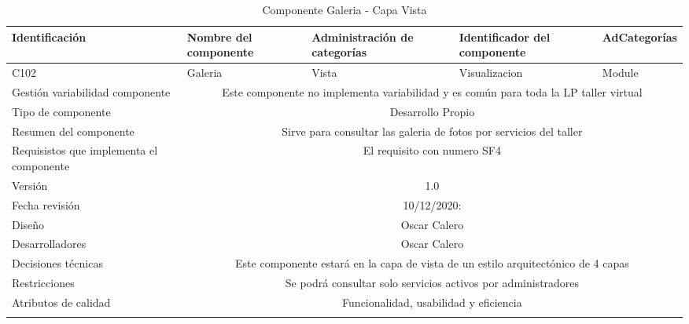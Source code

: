 \documentclass[10pt,a4paper,openany]{book}
\begin{document}
\begin{longtable}{|p{3cm}|p{3cm}|p{3cm}|p{3cm}|p{3cm}|} \hline
Identificación & Nombre del componente & Administración de categorías & Identificador del componente & AdCategorías \\[0.5ex] \hline
C102& Galeria& Vista& Visualizacion& Module\\[0.5ex] \hline
Gestión variabilidad componente & \multicolumn{4}{|c|}{Este componente no implementa variabilidad y es común para toda la LP taller virtual} \\ \hline
Tipo de componente & \multicolumn{4}{|c|}{Desarrollo Propio} \\ \hline
Resumen del componente & \multicolumn{4}{|c|}{Sirve para consultar las galeria de fotos por servicios del taller} \\ \hline
Requisistos que implementa el componente & \multicolumn{4}{|c|}{El requisito con numero SF4 } \\ \hline
Versión & \multicolumn{4}{|c|}{1.0 } \\ \hline
Fecha revisión & \multicolumn{4}{|c|}{ 10/12/2020:} \\ \hline
Diseño & \multicolumn{4}{|c|}{Oscar Calero} \\ \hline
Desarrolladores & \multicolumn{4}{|c|}{Oscar Calero} \\ \hline
Decisiones técnicas & \multicolumn{4}{|c|}{Este componente estará en la capa de vista de un estilo arquitectónico de 4 capas  } \\ \hline
Restricciones & \multicolumn{4}{|c|}{Se podrá consultar solo servicios activos por administradores} \\ \hline
Atributos de calidad & \multicolumn{4}{|c|}{Funcionalidad, usabilidad y eficiencia} \\ \hline
\caption{Componente Galeria - Capa Vista}
\label{table:t6}
\end{longtable}
\end{document}
